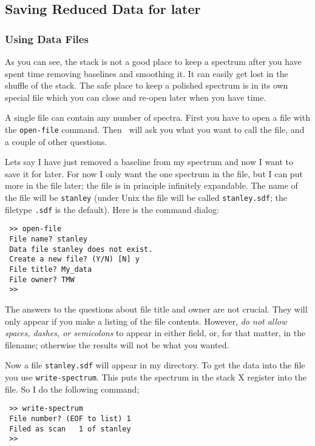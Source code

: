 \subsection{Saving Reduced Data for later}
\label{sec:specx_7}
\subsubsection{Using Data Files}
\label{sec:data-files}
As you can see, the stack is not a good place to keep a spectrum after
you have spent time removing baselines and smoothing it.  It can
easily get lost in the shuffle of the stack.  The safe place to keep a
polished spectrum is in its own special file which you can close and
re-open later when you have time.

A single file can contain any number of spectra.  First you have to
open a file with the {\tt open-file} command.  Then \SPECX\ will ask
you what you want to call the file, and a couple of other questions.

Lets say I have just removed a baseline from my spectrum and now I
want to save it for later.  For now I only want the one spectrum in the
file, but I can put more in the file later; the file is in principle
infinitely expandable. The name of the file will be {\tt stanley}
(under Unix the file will be called {\tt stanley.sdf}; the filetype
{\tt .sdf} is the default). Here is the command dialog:

\begin{verbatim}
 >> open-file
 File name? stanley
 Data file stanley does not exist.
 Create a new file? (Y/N) [N] y
 File title? My_data
 File owner? TMW
 >>
\end{verbatim}

The answers to the questions about file title and owner are not crucial.
They will only appear if you make a listing of the file contents. However,
{\it do not allow spaces, dashes, or semicolons} to appear in either
field, or, for that matter, in the filename; otherwise the results will
not be what you wanted. 

Now a file {\tt stanley.sdf} will appear in my directory.  To get the
data into the file you use {\tt write-spectrum}.  This puts the
spectrum in the stack X register into the file.  So I do the following
command;

\begin{verbatim}
 >> write-spectrum 
 File number? (EOF to list) 1
 Filed as scan   1 of stanley
 >> 
\end{verbatim}


